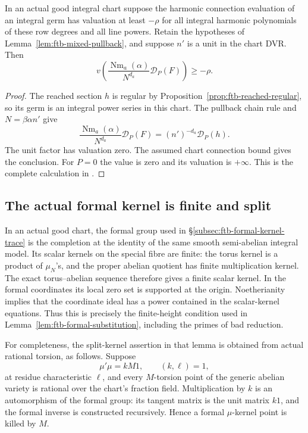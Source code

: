 \begin{srproposition}
\label{prop:ftb-mixed-value-bound}
In an actual good integral chart suppose the harmonic connection
evaluation of an integral germ has valuation at least \(-\rho\) for
all integral harmonic polynomials of these row degrees and all line
powers.
Retain the hypotheses of Lemma~\ref{lem:ftb-mixed-pullback}, and suppose
\(n'\) is a unit in the chart DVR.
Then
\[
 v\left(
  \frac{\operatorname{Nm}_a(\alpha)}{N^{d_a}}
                         \mathcal D_P(F)\right)\ge-\rho .
\]
\end{srproposition}
\begin{proof}
The reached section \(h\) is regular by
Proposition~\ref{prop:ftb-reached-regular}, so its germ is an integral
power series in this chart.
The pullback chain rule and \(N=\beta\alpha n'\) give
\[
 \frac{\operatorname{Nm}_a(\alpha)}{N^{d_a}}\mathcal D_P(F)
             =(n')^{-d_a}\mathcal D_P(h).
\]
The unit factor has valuation zero.
The assumed chart connection bound gives the conclusion.
For \(P=0\) the value is zero and its valuation is \(+\infty\).
This is the complete calculation in
.
\end{proof}

\subsection{The actual formal kernel is finite and split}
\label{subsec:ftb-actual-split-kernel}

In an actual good chart, the formal group used in
\S\ref{subsec:ftb-formal-kernel-trace} is the completion at the identity
of the same smooth semi-abelian integral model.
Its scalar kernels on the special fibre are finite: the torus kernel
is a product of \(\mu_N\)'s, and the proper abelian quotient has finite
multiplication kernel.
The exact torus--abelian sequence therefore gives a finite scalar
kernel.  In the formal coordinates its local zero set is supported
at the origin.  Noetherianity implies that the coordinate ideal has a
power contained in the scalar-kernel equations.
Thus this is precisely the finite-height condition used in
Lemma~\ref{lem:ftb-formal-substitution}, including the primes of bad
reduction.

For completeness, the split-kernel assertion in that lemma is
obtained from actual rational torsion, as follows.
Suppose
\[
 \mu'\mu=kM1,\qquad (k,\ell)=1,
\]
at residue characteristic \(\ell\), and every \(M\)-torsion point of
the generic abelian variety is rational over the chart's fraction
field.
Multiplication by \(k\) is an automorphism of the formal group:
its tangent matrix is the unit matrix \(k1\), and the formal inverse
is constructed recursively.
Hence a formal \(\mu\)-kernel point is killed by \(M\).

